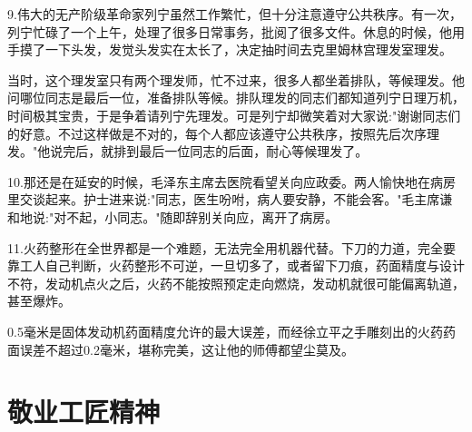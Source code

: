 \documentclass[UTF8]{ctexart}
\begin{document}
9.伟大的无产阶级革命家列宁虽然工作繁忙，但十分注意遵守公共秩序。有一次，列宁忙碌了一个上午，处理了很多日常事务，批阅了很多文件。休息的时候，他用手摸了一下头发，发觉头发实在太长了，决定抽时间去克里姆林宫理发室理发。\par
当时，这个理发室只有两个理发师，忙不过来，很多人都坐着排队，等候理发。他问哪位同志是最后一位，准备排队等候。排队理发的同志们都知道列宁日理万机，时间极其宝贵，于是争着请列宁先理发。可是列宁却微笑着对大家说:"谢谢同志们的好意。不过这样做是不对的，每个人都应该遵守公共秩序，按照先后次序理发。"他说完后，就排到最后一位同志的后面，耐心等候理发了。\par
10.那还是在延安的时候，毛泽东主席去医院看望关向应政委。两人愉快地在病房里交谈起来。护士进来说:"同志，医生吩咐，病人要安静，不能会客。"毛主席谦和地说:"对不起，小同志。"随即辞别关向应，离开了病房。\par
11.火药整形在全世界都是一个难题，无法完全用机器代替。下刀的力道，完全要靠工人自己判断，火药整形不可逆，一旦切多了，或者留下刀痕，药面精度与设计不符，发动机点火之后，火药不能按照预定走向燃烧，发动机就很可能偏离轨道，甚至爆炸。\par
0.5毫米是固体发动机药面精度允许的最大误差，而经徐立平之手雕刻出的火药药面误差不超过0.2毫米，堪称完美，这让他的师傅都望尘莫及。\par
\newpage
\section{敬业工匠精神}
\end{document}
